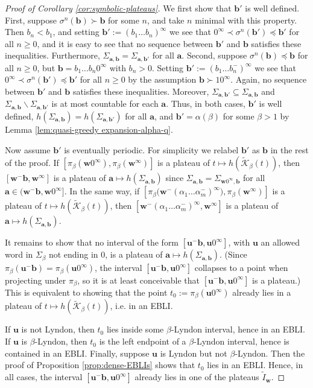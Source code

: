 \documentclass[11pt]{amsart}
\theoremstyle{definition}
\theoremstyle{remark}
\numberwithin{equation}{section}
\newcommand{\Kt}{\widetilde{\mathcal{K}}}
\renewcommand{\a}{ {\mathbf{a}}}
\renewcommand{\b}{ {\mathbf{b}}}
\renewcommand{\u}{\mathbf{u}}
\newcommand{\w}{\mathbf{w}}
\newcommand{\f}{\infty}
\newcommand{\al}{\alpha}
\newcommand{\lle}{\preccurlyeq}
\renewcommand{\a}{ \mathbf{a}}
\newcommand{\si}{\sigma}
\begin{document}
\begin{proof}[Proof of Corollary \ref{cor:symbolic-plateaus}]
We first show that $\b'$ is well defined. First, suppose $\si^n(\b)\succ\b$ for some $n$, and take $n$ minimal with this property. Then $b_n{<b_1}$, and setting $\b':=(b_1\dots b_n)^\f$ we see that $0^\f\prec\si^n(\b')\lle \b'$ for all $n\geq 0$, and it is easy to see that no sequence between $\b'$ and $\b$ satisfies these inequalities. Furthermore, $\Sigma_{\a,\b}=\Sigma_{\a,\b'}$ for all $\a$. Second, suppose $\si^n(\b)\lle \b$ for all $n\geq 0$, but $\b=b_1\dots b_n0^\f$ with $b_n{>0}$. Setting $\b':=(b_1\dots b_n^-)^\f$ we see that $0^\f\prec\si^n(\b')\lle \b'$ for all $n\geq 0$ by the assumption $\b\succ 10^\f$. Again, no sequence between $\b'$ and $\b$ satisfies these inequalities. Moreover, $\Sigma_{\a,\b'}\subseteq\Sigma_{\a,\b}$ and $\Sigma_{\a,\b}\backslash\Sigma_{\a,\b'}$ is at most countable for each $\a$.
Thus, in both cases, $\b'$ is well defined, $h(\Sigma_{\a,\b})=h(\Sigma_{\a,\b'})$ for all $\a$, and $\b'=\al(\beta)$ for some $\beta{>1}$ by Lemma \ref{lem:quasi-greedy expansion-alpha-q}.

Now assume $\b'$ is eventually periodic. For simplicity we relabel $\b'$ as $\b$ in the rest of the proof.
If $[\pi_\beta(\w0^\f),\pi_\beta(\w^\f)]$ is a plateau of $t\mapsto h(\Kt_\beta(t))$, then $[\w^-\b,\w^\f]$ is a plateau of $\a\mapsto h(\Sigma_{\a,\b})$ since $\Sigma_{\a,\b}=\Sigma_{\w0^\f,\b}$ for all $\a\in (\w^-\b,\w0^\f]$. In the same way, if $[\pi_\beta\big(\w^-(\al_1\dots\al_m^-)^\f\big),\pi_\beta(\w^\f)]$ is a plateau of $t\mapsto h(\Kt_\beta(t))$, then $[\w^-(\al_1\dots\al_m^-)^\f,\w^\f]$ is a plateau of $\a\mapsto h(\Sigma_{\a,\b})$.

It remains to show that no interval of the form $[\u^-\b,\u0^\f]$, with $\u$ an allowed word in $\Sigma_\beta$ { not ending in $0$}, is a plateau of $\a\mapsto h(\Sigma_{\a,\b})$. (Since $\pi_\beta(\u^-\b)=\pi_\beta(\u0^\f)$, the interval $[\u^-\b,\u0^\f]$ collapses to a point when projecting under $\pi_\beta$, so it is at least conceivable that $[\u^-\b,\u0^\f]$ is a plateau.) This is equivalent to showing that the point $t_0:=\pi_\beta(\u0^\f)$ already lies in a plateau of $t\mapsto h(\Kt_\beta(t))$, i.e. in an EBLI.

If $\u$ is not Lyndon, then $t_0$ lies inside some $\beta$-Lyndon interval, hence in an EBLI. If $\u$ is $\beta$-Lyndon, then $t_0$ is the left endpoint of a $\beta$-Lyndon interval, hence is contained in an EBLI. Finally, suppose $\u$ is Lyndon but not $\beta$-Lyndon. Then the proof of Proposition \ref{prop:dense-EBLIs} shows that $t_0$ lies in an EBLI. Hence, in all cases, the interval $[\u^-\b,\u0^\f]$ already lies in one of the plateaus $\tilde{I}_\w$.
\end{proof}
\end{document}
